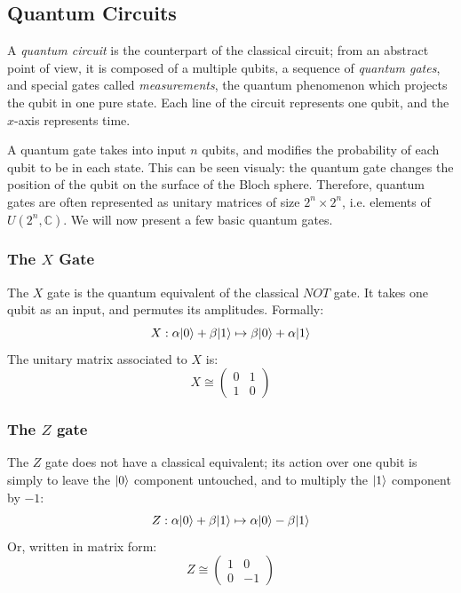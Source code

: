 \documentclass[12pt,a4paper]{article}
\theoremstyle{plain}
\theoremstyle{definition}
\DeclarePairedDelimiter\ket{\lvert}{\rangle}
\begin{document}
\subsection{Quantum Circuits}
A \emph{quantum circuit} is the counterpart of the classical circuit; from an abstract point of view, it is composed of a multiple qubits, a sequence of \emph{quantum gates}, and special gates called \emph{measurements}, the quantum phenomenon which projects the qubit in one pure state. Each line of the circuit represents one qubit, and the $x$-axis represents time. 

A quantum gate takes into input $n$ qubits, and modifies the probability of each qubit to be in each state. This can be seen visualy: the quantum gate changes the position of the qubit on the surface of the Bloch sphere. Therefore, quantum gates are often represented as unitary matrices of size $2^n \times 2^n$, i.e. elements of $U(2^n, \mathbb{C})$. We will now present a few basic quantum gates.

\subsubsection{The \texorpdfstring{$X$}{X} Gate}
The $X$ gate is the quantum equivalent of the classical $NOT$ gate. It takes one qubit as an input, and permutes its amplitudes. Formally:
\begin{equation*}
    X : \alpha\ket{0} + \beta\ket{1} \mapsto \beta\ket{0} + \alpha\ket{1}
\end{equation*}
The unitary matrix associated to $X$ is:
\begin{equation*}
    X \cong \begin{pmatrix}
        0&1\\
        1&0
    \end{pmatrix}
\end{equation*}

\subsubsection{The \texorpdfstring{$Z$}{Z} gate}
The $Z$ gate does not have a classical equivalent; its action over one qubit is simply to leave the $\ket{0}$ component untouched, and to multiply the $\ket{1}$ component by $-1$:
\begin{equation*}
    Z : \alpha\ket{0} + \beta\ket{1} \mapsto \alpha\ket{0} - \beta\ket{1}
\end{equation*}
Or, written in matrix form:
\begin{equation*}
    Z \cong \begin{pmatrix}
        1&0\\
        0&-1
    \end{pmatrix}
\end{equation*}
\end{document}
